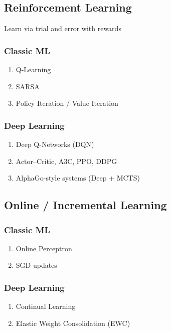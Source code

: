 \subsection*{Reinforcement Learning}

Learn via trial and error with rewards

\begin{table}[H]
\begin{minipage}{0.45\linewidth}
\subsubsection*{Classic ML}
\begin{enumerate}
    \item Q-Learning
    \item SARSA
    \item Policy Iteration / Value Iteration
\end{enumerate}
\end{minipage}
\begin{minipage}{0.45\linewidth}
\subsubsection*{Deep Learning}
\begin{enumerate}
    \item Deep Q-Networks (DQN)
    \item Actor–Critic, A3C, PPO, DDPG
    \item AlphaGo-style systems (Deep + MCTS)
\end{enumerate}
\end{minipage}
\end{table}



\subsection*{Online / Incremental Learning}

\begin{table}[H]
\begin{minipage}{0.45\linewidth}
\subsubsection*{Classic ML}
\begin{enumerate}
    \item Online Perceptron
    \item SGD updates
\end{enumerate}
\end{minipage}
\begin{minipage}{0.45\linewidth}
\subsubsection*{Deep Learning}
\begin{enumerate}
    \item Continual Learning
    \item Elastic Weight Consolidation (EWC)
\end{enumerate}
\end{minipage}
\end{table}


